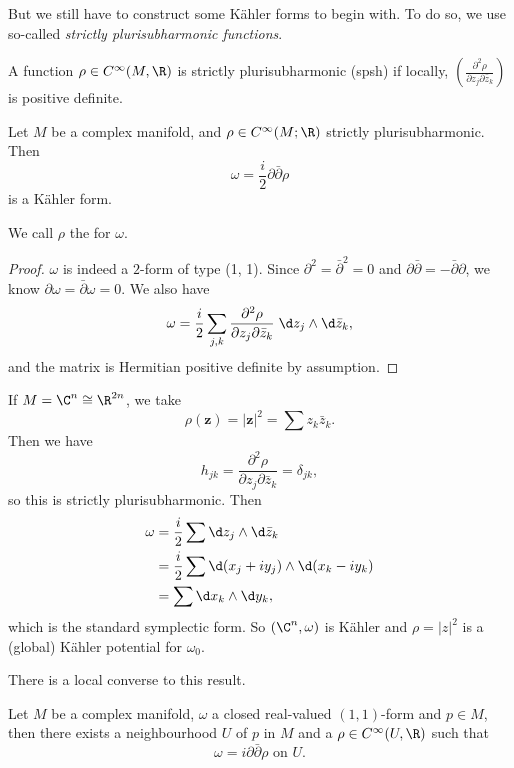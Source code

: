 \documentclass[a4paper]{article}
\begin{document}
But we still have to construct some K\"ahler forms to begin with. To do so, we use so-called \emph{strictly plurisubharmonic functions}.
\begin{defi}
  A function $\rho \in C^\infty(M, \R)$ is strictly plurisubharmonic (spsh) if locally, $\left(\frac{\partial^2 \rho}{\partial z_j \partial \bar{z}_k}\right)$ is positive definite.
\end{defi}
\begin{prop}
  Let $M$ be a complex manifold, and $\rho \in C^\infty(M; \R)$ strictly plurisubharmonic. Then
  \[
    \omega = \frac{i}{2} \partial \bar{\partial} \rho
  \]
  is a K\"ahler form.
\end{prop}
We call $\rho$ the  for $\omega$.
\begin{proof}
  $\omega$ is indeed a $2$-form of type (1, 1). Since $\partial^2 = \bar{\partial}^2 = 0$ and $\partial \bar{\partial} = -\bar{\partial} \partial$, we know $\partial \omega = \bar{\partial} \omega = 0$. We also have
  \[
    \omega = \frac{i}{2} \sum_{j, k} \frac{\partial^2 \rho}{\partial z_j \partial \bar{z}_k}\;\d z_j\wedge \d \bar{z}_k,
  \]
  and the matrix is Hermitian positive definite by assumption.
\end{proof}

\begin{eg}
  If $M = \C^n \cong \R^{2n}$, we take
  \[
    \rho(\mathbf{z}) = |\mathbf{z}|^2 = \sum z_k \bar{z}_k.
  \]
  Then we have
  \[
    h_{jk} = \frac{\partial^2 \rho}{\partial z_j \partial \bar{z}_k} = \delta_{jk},
  \]
  so this is strictly plurisubharmonic. Then
  \begin{align*}
    \omega &= \frac{i}{2} \sum \d z_j \wedge \d \bar{z}_k \\
    &= \frac{i}{2} \sum \d (x_j + i y_j) \wedge \d (x_k - i y_k)\\
    &= \sum \d x_k \wedge \d y_k,
  \end{align*}
  which is the standard symplectic form. So $(\C^n, \omega)$ is K\"ahler and $\rho = |z|^2$ is a (global) K\"ahler potential for $\omega_0$.
\end{eg}

There is a local converse to this result.

\begin{prop}
  Let $M$ be a complex manifold, $\omega$ a closed real-valued $(1, 1)$-form and $p \in M$, then there exists a neighbourhood $U$ of $p$ in $M$ and a $\rho \in C^\infty(U, \R)$ such that
  \[
    \omega = i \partial \bar{\partial} \rho\text{ on }U.
  \]
\end{prop}
\end{document}
